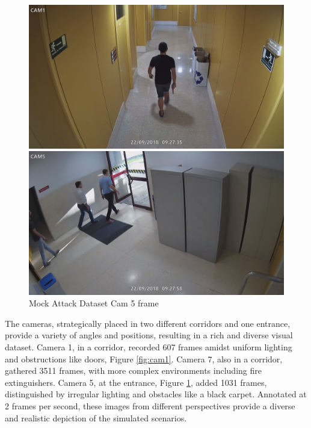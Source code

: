 \begin{figure}[h]
    \centering

    \begin{minipage}{0.47\textwidth}
        \centering
        \includegraphics[width=\textwidth]{figs/cam1.jpg} %
        \caption{Mock Attack Dataset\cite{rfc45} Cam 1 frame}
        \label{fig:cam1}
    \end{minipage}
    \hfill
    \begin{minipage}{0.47\textwidth}
        \centering
        \includegraphics[width=\textwidth]{figs/cam5.jpg} %
        \caption{Mock Attack Dataset\cite{rfc45} Cam 5 frame}
        \label{fig:cam5}
    \end{minipage}

\end{figure}

The cameras, strategically placed in two different corridors and one entrance, provide a variety of angles and positions, resulting in a rich and diverse visual dataset. Camera 1, in a corridor, recorded 607 frames amidst uniform lighting and obstructions like doors, Figure \ref{fig:cam1}. Camera 7, also in a corridor, gathered 3511 frames, with more complex environments including fire extinguishers. Camera 5, at the entrance, Figure \ref{fig:cam5}, added 1031 frames, distinguished by irregular lighting and obstacles like a black carpet. Annotated at 2 frames per second, these images from different perspectives provide a diverse and realistic depiction of the simulated scenarios.


